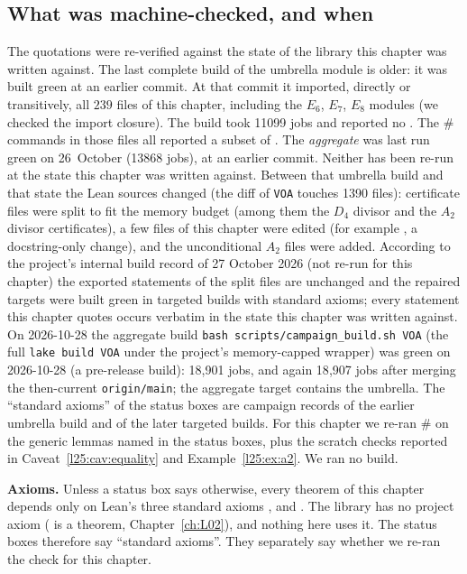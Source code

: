 \subsection{What was machine-checked, and when}\label{l25:sec:machine}

The quotations were re-verified against the state of the library this chapter was written against. The last complete build of the umbrella module
 is older: it was built green at an earlier commit. At that commit it imported, directly or transitively, all $239$ files of this chapter, including the $E_6$, $E_7$, $E_8$ modules
(we checked the import closure). The build took 11099 jobs and reported no
. The \# commands in those files all reported a subset of
. The \emph{aggregate}  was last run green on
26~October (13868 jobs), at an earlier commit. Neither has been re-run at the state this chapter was written against. Between
that umbrella build and that state the Lean sources changed (the diff of \texttt{VOA} touches
1390 files): certificate files were split to fit the memory budget (among them the $D_4$ divisor and the $A_2$ divisor
certificates), a few files of this chapter were edited (for example , a
docstring-only change), and the unconditional $A_2$ files were added. According to the project's internal build record of
27 October 2026 (not re-run for this chapter) the exported statements of the split files are unchanged and the repaired targets were built green in
targeted builds with standard axioms; every statement this chapter quotes occurs verbatim in the state this chapter was written against. On 2026-10-28 the aggregate build \texttt{bash scripts/campaign\_build.sh VOA} (the full \texttt{lake build VOA} under the project's memory-capped wrapper) was green on 2026-10-28 (a pre-release build): 18{,}901 jobs, and again 18{,}907 jobs after merging the then-current \texttt{origin/main}; the aggregate target contains the umbrella. The ``standard axioms'' of the
status boxes are campaign records of the earlier umbrella build and of the later targeted builds. For this chapter we re-ran
\# on the generic lemmas named in the status boxes, plus the scratch checks reported in
Caveat~\ref{l25:cav:equality} and Example~\ref{l25:ex:a2}. We ran no build.

\textbf{Axioms.} Unless a status box says otherwise, every theorem of this chapter depends only on Lean's three
standard axioms ,  and . The library has no project axiom
( is a theorem, Chapter~\ref{ch:L02}), and nothing here uses it. The status boxes therefore say
``standard axioms''. They separately say whether we re-ran the check for this chapter.

